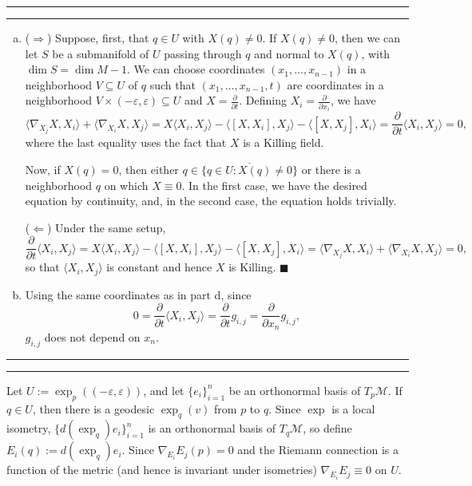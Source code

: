 \documentclass[11pt]{article}
\newcounter{questionCounter}
\newcounter{partCounter}[questionCounter]
\newenvironment{question}[2][\arabic{questionCounter}]{%
    \setcounter{partCounter}{0}%
    \vspace{.25in} \hrule \vspace{0.5em}%
        \noindent{\bf #2}%
    \vspace{0.8em} \hrule \vspace{.10in}%
    \addtocounter{questionCounter}{1}%
}{}
\renewcommand{\qed}{\quad \ensuremath{\blacksquare}}    %
\renewcommand{\dim}{\operatorname{dim}} %
\newcommand{\M}{\mathcal{M}}            %
\newcommand{\e}{\varepsilon}            %
\begin{document}
\begin{question}{Exercise 5}
\begin{enumerate}[a)]
\item ($\Rightarrow$) Suppose, first, that $q \in U$ with $X(q) \neq 0$. If
$X(q) \neq 0$, then we can let $S$ be a submanifold of $U$ passing through $q$
and normal to $X(q)$, with $\dim S = \dim M - 1$. We can choose coordinates
$(x_1,\dots,x_{n - 1})$ in a neighborhood $V \subseteq U$ of $q$ such that
$(x_1,\dots,x_{n - 1},t)$ are coordinates in a neighborhood
$V \times (-\e,\e) \subseteq U$ and $X = \frac{\partial}{\partial t}$. Defining
$X_i = \frac{\partial}{\partial x_i}$, we have
\[\langle \nabla_{X_j} X, X_i \rangle + \langle \nabla_{X_i} X, X_j \rangle
    = X\langle X_i, X_j \rangle - \langle [X,X_i], X_j \rangle
        - \langle [X,X_j], X_i \rangle
    = \frac{\partial}{\partial t} \langle X_i, X_j \rangle
    = 0
,\]
where the last equality uses the fact that $X$ is a Killing field.

Now, if $X(q) = 0$, then either $q \in \overline{\{q \in U : X(q) \neq 0\}}$ or
there is a neighborhood $q$ on which $X \equiv 0$. In the first case, we have
the desired equation by continuity, and, in the second case, the equation holds
trivially.

($\Leftarrow$) Under the same setup,
\[\frac{\partial}{\partial t} \langle X_i, X_j \rangle
    = X\langle X_i, X_j \rangle - \langle [X,X_i], X_j \rangle
        - \langle [X,X_j], X_i \rangle
    = \langle \nabla_{X_j} X, X_i \rangle + \langle \nabla_{X_i} X, X_j \rangle
    = 0
,\]
so that $\langle X_i, X_j \rangle$ is constant and hence $X$ is Killing. \qed

\item Using the same coordinates as in part d, since
\[0
    = \frac{\partial}{\partial t} \langle X_i, X_j \rangle
    = \frac{\partial}{\partial t} g_{i,j}
    = \frac{\partial}{\partial x_n} g_{i,j}
,\]
$g_{i,j}$ does not depend on $x_n$.
\end{enumerate}
\end{question}

\begin{question}{Exercise 7}
Let $U := \exp_p((-\e,\e))$, and let $\{e_i\}_{i = 1}^n$ be an orthonormal
basis of $T_p\M$. If $q \in U$, then there is a geodesic $\exp_q(v)$ from $p$
to $q$. Since $\exp$ is a local isometry, $\{d(\exp_q)e_i\}_{i = 1}^n$ is an
orthonormal basis of $T_q\M$, so define $E_i(q) := d(\exp_q)e_i$. Since
$\nabla_{E_i} E_j(p) = 0$ and the Riemann connection is a function of the
metric (and hence is invariant under isometries)
$\nabla_{E_i} E_j \equiv 0$ on $U$.
\end{question}
\end{document}
